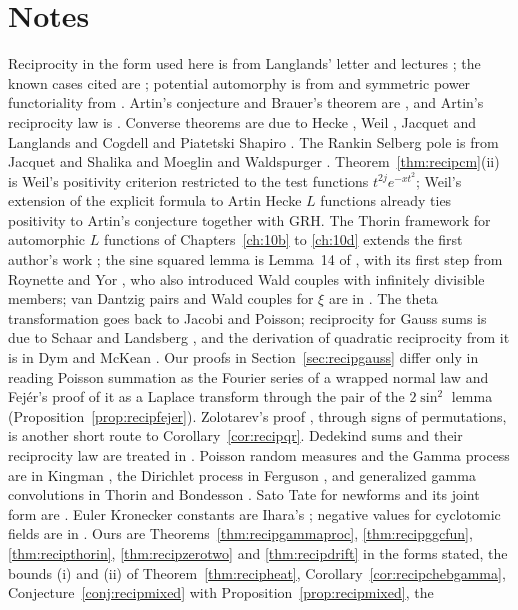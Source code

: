 \section{Notes}

Reciprocity in the form used here is from Langlands' letter and lectures \cite{langlands1967,langlands1970}; the known cases cited are \cite{langlands1980,tunnell1981,wiles1995,taylorwiles1995,bcdt2001,kharewintenberger2009,kharewintenberger2009b,kisin2009}; potential automorphy is from \cite{hsbt2010,blght2011} and symmetric power functoriality from \cite{newtonthorne2021,newtonthorne2021b}. Artin's conjecture and Brauer's theorem are \cite{artin1924,brauer1947}, and Artin's reciprocity law is \cite{artin1927}. Converse theorems are due to Hecke \cite{hecke1936}, Weil \cite{weil1967}, Jacquet and Langlands \cite{jacquetlanglands1970} and Cogdell and Piatetski Shapiro \cite{cogdellps1994}. The Rankin Selberg pole is from Jacquet and Shalika \cite{jacquetshalika1981} and Moeglin and Waldspurger \cite{moeglinwaldspurger1989}. Theorem~\ref{thm:recipcm}(ii) is Weil's positivity criterion \cite{weil1952,weil1972} restricted to the test functions $t^{2j}e^{-xt^2}$; Weil's extension of the explicit formula to Artin Hecke $L$ functions \cite{weil1972} already ties positivity to Artin's conjecture together with GRH. The Thorin framework for automorphic $L$ functions of Chapters~\ref{ch:10b} to \ref{ch:10d} extends the first author's work \cite{polson2017,polson2018vdp}; the sine squared lemma is Lemma~14 of \cite{polson2018vdp}, with its first step from Roynette and Yor \cite{roynetteyor2005}, who also introduced Wald couples with infinitely divisible members; van Dantzig pairs and Wald couples for $\xi$ are in \cite{roynetteyor2005,polson2018vdp,konstantopoulospatiesarkar2024}. The theta transformation goes back to Jacobi and Poisson; reciprocity for Gauss sums is due to Schaar \cite{schaar1850} and Landsberg \cite{landsberg1893}, and the derivation of quadratic reciprocity from it is in Dym and McKean \cite{dymmckean1972}. Our proofs in Section~\ref{sec:recipgauss} differ only in reading Poisson summation as the Fourier series of a wrapped normal law and Fej\'er's proof of it as a Laplace transform through the pair of the $2\sin^2$ lemma (Proposition~\ref{prop:recipfejer}). Zolotarev's proof \cite{zolotarev1872}, through signs of permutations, is another short route to Corollary~\ref{cor:recipqr}. Dedekind sums and their reciprocity law are treated in \cite{rademachergrosswald1972}. Poisson random measures and the Gamma process are in Kingman \cite{kingman1993}, the Dirichlet process in Ferguson \cite{ferguson1973}, and generalized gamma convolutions in Thorin \cite{thorin1977} and Bondesson \cite{bondesson1992}. Sato Tate for newforms and its joint form are \cite{blght2011,harris2009}. Euler Kronecker constants are Ihara's \cite{ihara2006}; negative values for cyclotomic fields are in \cite{fordlucamoree2014}. Ours are Theorems~\ref{thm:recipgammaproc}, \ref{thm:recipggcfun}, \ref{thm:recipthorin}, \ref{thm:recipzerotwo} and \ref{thm:recipdrift} in the forms stated, the bounds (i) and (ii) of Theorem~\ref{thm:recipheat}, Corollary~\ref{cor:recipchebgamma}, Conjecture~\ref{conj:recipmixed} with Proposition~\ref{prop:recipmixed}, the 